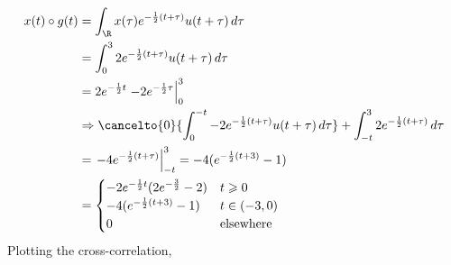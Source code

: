 \documentclass{article}
\begin{document}
\begin{align}
    x(t) \circ g(t) &= \int_{\R} x(\tau) e^{-\frac{1}{2} (t + \tau)} u(t + \tau) \, d\tau \\
    &= \int_0^3 2e^{-\frac{1}{2} (t + \tau)} u(t + \tau) \, d\tau \\
    &= 2e^{-\frac{1}{2} t} \left.-2e^{-\frac{1}{2} \tau}\right|_0^3 \\
    &\Rightarrow \cancelto{0}{\int_0^{-t} -2e^{-\frac{1}{2} (t + \tau)} u(t + \tau) \, d\tau} + \int_{-t}^3 2e^{-\frac{1}{2} (t + \tau)} \, d\tau \\
    &= \left.-4e^{-\frac{1}{2} (t + \tau)}\right|_{-t}^3 = -4(e^{-\frac{1}{2} (t + 3)} - 1) \\
    &=
    \begin{cases}
        -2e^{-\frac{1}{2} t} (2e^{-\frac{3}{2}} - 2) & t \geqslant 0 \\
        -4(e^{-\frac{1}{2} (t + 3)} - 1) & t \in (-3, 0) \\
        0 & \text{elsewhere}
    \end{cases}
\end{align}
Plotting the cross-correlation,
\begin{center}
\end{center}

\subsection{}
\end{document}
